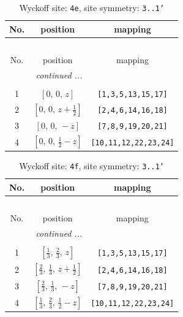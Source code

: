 \documentclass[fleqn,8pt]{jsarticle}
\begin{document}
\begin{longtable}{ccc}
\caption{Wyckoff site: {\tt 4e}, site symmetry: {\tt 3..1'}}
 \\
 \hline \hline
No. & position & mapping \\ \hline \endfirsthead

\multicolumn{2}{l}{\tablename\ \thetable{}} \\
 \hline \hline
No. & position & mapping \\ \hline \endhead

 \hline \hline
\multicolumn{2}{r}{\footnotesize\it continued ...} \\ \endfoot

 \hline \hline
\multicolumn{2}{r}{} \\ \endlastfoot

1 & $\left[ 0,\, 0,\, z \right]$ & {\tt [1,3,5,13,15,17]} \\ \hline
2 & $\left[ 0,\, 0,\, z + \frac{1}{2} \right]$ & {\tt [2,4,6,14,16,18]} \\ \hline
3 & $\left[ 0,\, 0,\, - z \right]$ & {\tt [7,8,9,19,20,21]} \\ \hline
4 & $\left[ 0,\, 0,\, \frac{1}{2} - z \right]$ & {\tt [10,11,12,22,23,24]} \\
\end{longtable}
\renewcommand{\arraystretch}{1.2}
\begin{longtable}{ccc}
\caption{Wyckoff site: {\tt 4f}, site symmetry: {\tt 3..1'}}
 \\
 \hline \hline
No. & position & mapping \\ \hline \endfirsthead

\multicolumn{2}{l}{\tablename\ \thetable{}} \\
 \hline \hline
No. & position & mapping \\ \hline \endhead

 \hline \hline
\multicolumn{2}{r}{\footnotesize\it continued ...} \\ \endfoot

 \hline \hline
\multicolumn{2}{r}{} \\ \endlastfoot

1 & $\left[ \frac{1}{3},\, \frac{2}{3},\, z \right]$ & {\tt [1,3,5,13,15,17]} \\ \hline
2 & $\left[ \frac{2}{3},\, \frac{1}{3},\, z + \frac{1}{2} \right]$ & {\tt [2,4,6,14,16,18]} \\ \hline
3 & $\left[ \frac{2}{3},\, \frac{1}{3},\, - z \right]$ & {\tt [7,8,9,19,20,21]} \\ \hline
4 & $\left[ \frac{1}{3},\, \frac{2}{3},\, \frac{1}{2} - z \right]$ & {\tt [10,11,12,22,23,24]} \\
\end{longtable}
\end{document}
